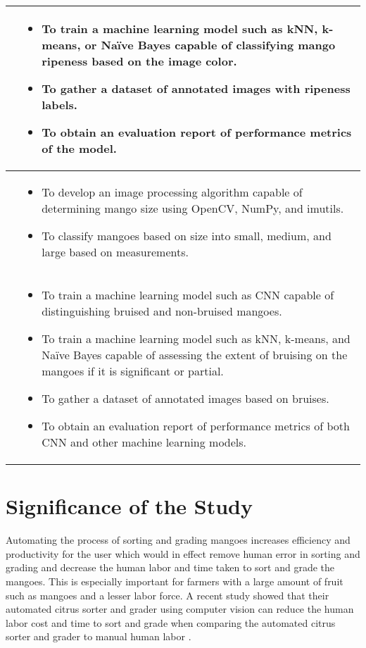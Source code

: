 \begin{center}
{\begin{longtable}{p{}|p{}}
			\Paste{SO5} & \begin{itemize}
				\item To train a machine learning model such as kNN, k-means, or Naïve Bayes capable
				of classifying mango ripeness based on the image color.
				\item To gather a dataset of annotated images with ripeness labels.
				\item To obtain an evaluation report of performance metrics of the model.
			\end{itemize} \\ \hline
			
			\Paste{SO6} & \begin{itemize}
				\item To develop an image processing algorithm capable of determining mango 
				size using OpenCV, NumPy, and imutils.
				\item To classify mangoes based on size into small, medium, and large based on measurements.
			\end{itemize} \\ \hline
			
			\Paste{SO7} & \begin{itemize}
				\item To train a machine learning model such as 
				CNN capable of distinguishing bruised and non-bruised mangoes.
				\item To train a machine learning model such as kNN, k-means, and Naïve Bayes 
				capable of assessing the extent of bruising on the mangoes if it is significant or partial.
				\item To gather a dataset of annotated images based on bruises.
				\item To obtain an evaluation report of performance metrics of both CNN and other machine learning models.
			\end{itemize} \\ \hline
			
		\end{longtable}
	}
\end{center}


\section{Significance of the Study}

Automating the process of sorting and grading mangoes increases efficiency and 
productivity for the user which would in effect remove human error in sorting and
grading and decrease the human labor and time taken to sort and grade the mangoes.
This is especially important for farmers with a large amount of fruit such as mangoes and a
lesser labor force. A recent study showed that
their automated citrus sorter and grader using computer vision can reduce the human
labor cost and time to sort and grade when comparing the automated citrus sorter and grader
to manual human labor \cite{chakraborty-development-2023}. 

